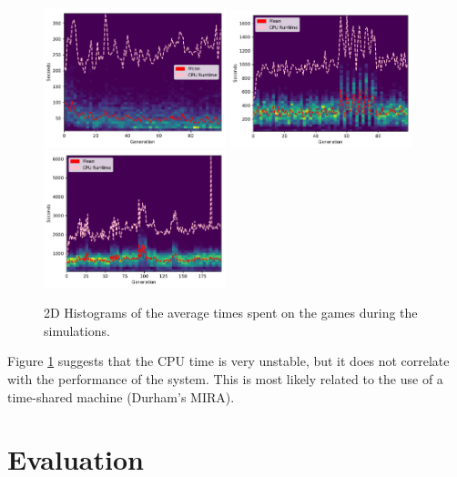\documentclass[12pt,a4paper]{article}
\begin{document}
            \begin{figure}[!ht]
                \centering
                \includegraphics[width=53mm]{images/results/1ply/simulation_timings.pdf}
                \includegraphics[width=53mm]{images/results/3ply/simulation_timings.pdf}
                \includegraphics[width=53mm]{images/results/6ply/simulation_timings.pdf}
                \caption{2D Histograms of the average times spent on the games during the simulations. \label{chart_cpu_times}}
            \end{figure}

            Figure \ref{chart_cpu_times} suggests that the CPU time is very unstable, but it does not correlate with the performance of the system. This is most likely related to the use of a  time-shared machine (Durham's MIRA). %

\section{Evaluation}
 
\end{document}
